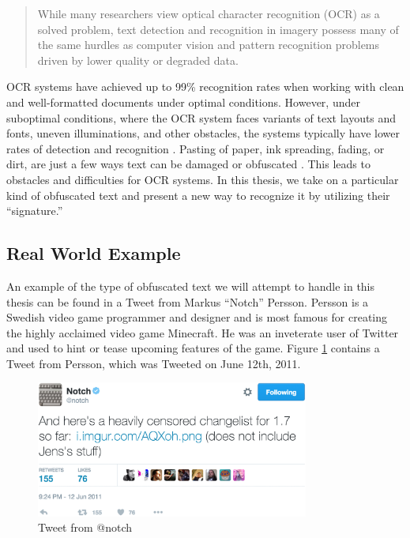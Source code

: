 \begin{quote}
    While many researchers view optical character recognition (OCR) as a solved problem, text detection and recognition in imagery possess many of the same hurdles as computer vision and pattern recognition problems driven by lower quality or degraded data.
\end{quote}

OCR systems have achieved up to 99\% recognition rates when working with clean and well-formatted documents under optimal conditions. However, under suboptimal conditions, where the OCR system faces variants of text layouts and fonts, uneven illuminations, and other obstacles, the systems typically have lower rates of detection and recognition \citep{ye2015text}. Pasting of paper, ink spreading, fading, or dirt, are just a few ways text can be damaged or obfuscated \citep{bhardwaj2014imaging}. This leads to obstacles and difficulties for OCR systems. In this thesis, we take on a particular kind of obfuscated text and present a new way to recognize it by utilizing their ``signature.''

\subsection{Real World Example}
An example of the type of obfuscated text we will attempt to handle in this thesis can be found in a Tweet from Markus ``Notch'' Persson. Persson is a Swedish video game programmer and designer and is most famous for creating the highly acclaimed video game Minecraft. He was an inveterate user of Twitter and used to hint or tease upcoming features of the game. Figure \ref{ref:notch_twitter} contains a Tweet from Persson, which was Tweeted on June 12th, 2011.

\begin{figure}[ht]
    \centering
    \includegraphics[width=0.8\textwidth]{fig/chapter1/notch_tweet.jpg}
    \caption{Tweet from @notch}
    \label{ref:notch_twitter}
\end{figure}

